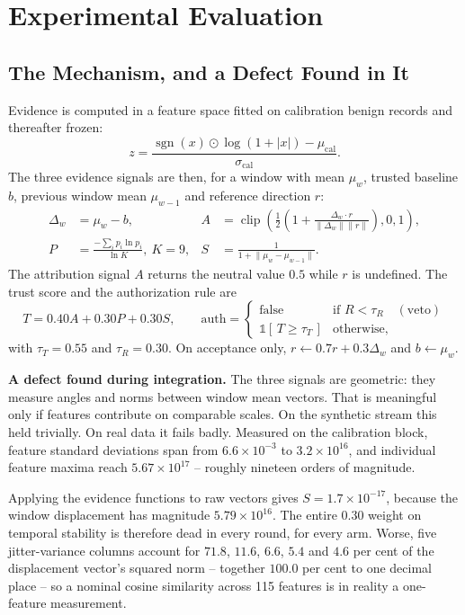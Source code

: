 \documentclass[12pt,a4paper]{report}
\begin{document}
\section{Experimental Evaluation}

\subsection{The Mechanism, and a Defect Found in It}

Evidence is computed in a feature space fitted on calibration benign records and
thereafter frozen:
\begin{equation}
z = \frac{\operatorname{sgn}(x)\odot\log(1+|x|)-\mu_{\mathrm{cal}}}
         {\sigma_{\mathrm{cal}}}.
\end{equation}
The three evidence signals are then, for a window with mean $\mu_w$, trusted
baseline $b$, previous window mean $\mu_{w-1}$ and reference direction $r$:
\begin{align}
\Delta_w &= \mu_w - b, &
A &= \operatorname{clip}\!\left(\tfrac{1}{2}\left(1+\tfrac{\Delta_w\cdot r}
     {\lVert\Delta_w\rVert\lVert r\rVert}\right),0,1\right),\\
P &= \frac{-\sum_i p_i\ln p_i}{\ln K},\ K=9, &
S &= \frac{1}{1+\lVert\mu_w-\mu_{w-1}\rVert}.
\end{align}
The attribution signal $A$ returns the neutral value $0.5$ while $r$ is
undefined. The trust score and the authorization rule are
\begin{equation}
T = 0.40A + 0.30P + 0.30S,\qquad
\mathrm{auth}=\begin{cases}
\text{false} & \text{if } R<\tau_R\quad(\text{veto})\\
\mathbb{1}[\,T\ge\tau_T\,] & \text{otherwise,}
\end{cases}
\end{equation}
with $\tau_T=0.55$ and $\tau_R=0.30$. On acceptance only,
$r \leftarrow 0.7r+0.3\Delta_w$ and $b \leftarrow \mu_w$.

\textbf{A defect found during integration.} The three signals are geometric: they
measure angles and norms between window mean vectors. That is meaningful only if
features contribute on comparable scales. On the synthetic stream this held
trivially. On real data it fails badly. Measured on the calibration block,
feature standard deviations span from $6.6\times10^{-3}$ to $3.2\times10^{16}$,
and individual feature maxima reach $5.67\times10^{17}$ -- roughly nineteen
orders of magnitude.

Applying the evidence functions to raw vectors gives $S = 1.7\times10^{-17}$,
because the window displacement has magnitude $5.79\times10^{16}$. The entire
$0.30$ weight on temporal stability is therefore dead in every round, for every
arm. Worse, five jitter-variance columns account for $71.8$, $11.6$, $6.6$, $5.4$
and $4.6$ per cent of the displacement vector's squared norm -- together $100.0$
per cent to one decimal place -- so a nominal cosine similarity across 115
features is in reality a one-feature measurement.
\end{document}

